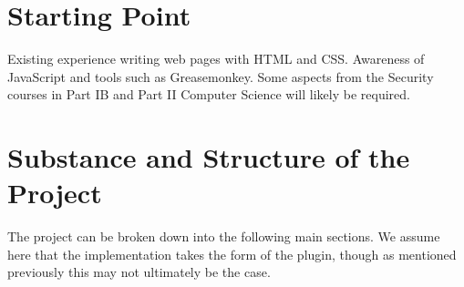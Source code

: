 \section*{Starting Point}

Existing experience writing web pages with HTML and CSS. Awareness of JavaScript and tools such as Greasemonkey. Some aspects from the Security courses in Part IB and Part II Computer Science will likely be required.


\section*{Substance and Structure of the Project}


The project can be broken down into the following main sections. We assume here that the implementation takes the form of the plugin, though as mentioned previously this may not ultimately be the case.

